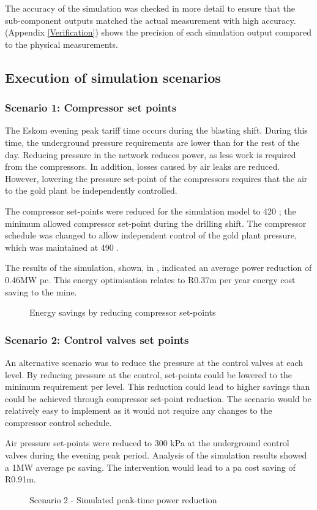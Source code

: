 \par
The accuracy of the simulation was checked in more detail to ensure that the sub-component outputs matched the actual measurement with high accuracy. (Appendix \ref{Verification}) shows the precision of each simulation output compared to the physical measurements.
\subsection{Execution of simulation scenarios}
\subsubsection{Scenario 1: Compressor set points}
The Eskom evening peak tariff time occurs during the blasting shift. During this time, the underground pressure requirements are lower than for the rest of the day. Reducing pressure in the network reduces power, as less work is required from the compressors. In addition, losses caused by air leaks are reduced. However, lowering the pressure  set-point of the compressors requires that the air to the gold plant be independently controlled. 
\par 
The compressor  set-points were reduced for the simulation model to 420 ; the minimum allowed compressor  set-point during the drilling shift. The compressor schedule was changed to allow independent control of the gold plant pressure, which was maintained at 490 . 
\par 
The results of the simulation, shown, in , indicated an average power reduction of 0.46MW \gls{pc}. This energy optimisation relates to R0.37m per year energy cost saving to the mine.
\clearpage 
\begin{figure}[!htbp]
	\centering
	
	\caption{Energy savings by reducing compressor  set-points}
	\label{fig: CompSetpoints Results Beatrix}
\end{figure}

\subsubsection{Scenario 2: Control valves set points}
An alternative scenario was to reduce the pressure at the control valves at each level. By reducing pressure at the control,  set-points could be lowered to the minimum requirement per level. This reduction could lead to higher savings than could be achieved through compressor set-point reduction. The scenario would be relatively easy to implement as it would not require any changes to the compressor control schedule.
\par 
Air pressure  set-points were reduced to 300 kPa at the underground control valves during the evening peak period. Analysis of the simulation results showed a 1MW average \gls{pc} saving. The intervention would lead to a \gls{pa} cost saving of R0.91m.
\begin{figure}[h!]
	\centering
	
	\caption{Scenario 2 - Simulated peak-time power reduction}
	\label{fig: Control Valve Results Beatrix}
\end{figure}
